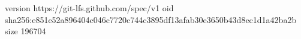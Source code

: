 version https://git-lfs.github.com/spec/v1
oid sha256:e851e52a896404c046c7720c744c3895df13afab30e3650b43d8ec1d1a42ba2b
size 196704
